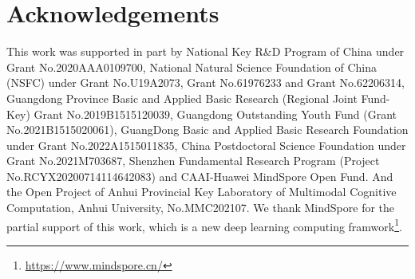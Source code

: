 \documentclass[11pt]{article}
\begin{document}
\section*{Acknowledgements} 
This work was supported in part by National Key R\&D Program of China under Grant No.2020AAA0109700, 
National Natural Science Foundation of China (NSFC) under Grant No.U19A2073, Grant No.61976233 and Grant No.62206314, 
Guangdong Province Basic and Applied Basic Research (Regional Joint Fund-Key) Grant No.2019B1515120039, 
Guangdong Outstanding Youth Fund (Grant No.2021B1515020061), 
GuangDong Basic and Applied Basic Research Foundation under Grant No.2022A1515011835, 
China Postdoctoral Science Foundation under Grant No.2021M703687, 
Shenzhen Fundamental Research Program (Project No.RCYX20200714114642083)  and CAAI-Huawei MindSpore Open Fund. 
And the Open Project of Anhui Provincial Key Laboratory of Multimodal Cognitive Computation, Anhui University, No.MMC202107. 
We thank MindSpore for the partial support of this work, which is a new deep learning computing framwork\footnote{\href{https://www.mindspore.cn/}{https://www.mindspore.cn/}}.




\end{document}
